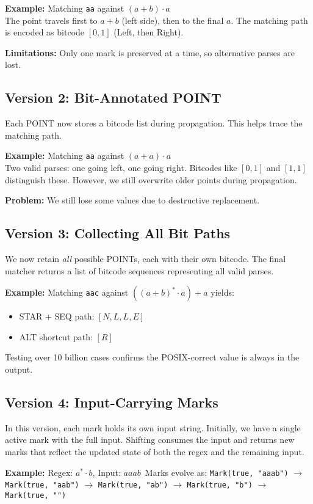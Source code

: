 \documentclass[11pt]{article}
\begin{document}
\textbf{Example:} Matching \texttt{aa} against $(a + b) \cdot a$\\
The point travels first to $a + b$ (left side), then to the final $a$. The matching path is encoded as bitcode $[0,1]$ (Left, then Right).

\textbf{Limitations:}
Only one mark is preserved at a time, so alternative parses are lost.

\subsection*{Version 2: Bit-Annotated POINT}
Each POINT now stores a bitcode list during propagation. This helps trace the matching path.

\textbf{Example:} Matching \texttt{aa} against $(a + a) \cdot a$\\
Two valid parses: one going left, one going right. Bitcodes like $[0,1]$ and $[1,1]$ distinguish these. However, we still overwrite older points during propagation.

\textbf{Problem:} We still lose some values due to destructive replacement.

\subsection*{Version 3: Collecting All Bit Paths}
We now retain \emph{all} possible POINTs, each with their own bitcode. The final matcher returns a list of bitcode sequences representing all valid parses.

\textbf{Example:} Matching \texttt{aac} against $((a + b)^* \cdot a) + a$ yields:
\begin{itemize}
\item STAR + SEQ path: $[N, L, L, E]$
\item ALT shortcut path: $[R]$
\end{itemize}

Testing over 10 billion cases confirms the POSIX-correct value is always in the output.

\subsection{Version 4: Input-Carrying Marks}
In this version, each mark holds its own input string. Initially, we have a single active mark with the full input. Shifting consumes the input and returns new marks that reflect the updated state of both the regex and the remaining input.

\textbf{Example:}
Regex: $a^* \cdot b$, Input: $aaab$\
Marks evolve as:
\texttt{Mark(true, "aaab")} $\rightarrow$
\texttt{Mark(true, "aab")} $\rightarrow$
\texttt{Mark(true, "ab")} $\rightarrow$
\texttt{Mark(true, "b")} $\rightarrow$
\texttt{Mark(true, "")}
\end{document}
